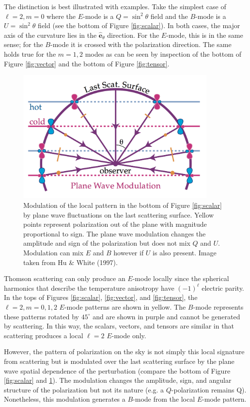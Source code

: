 \documentclass[a4paper,10pt]{article}
\begin{document}
{\noindent}The distinction is best illustrated with examples. Take the simplest case of $\ell=2,m=0$ where the $E$-mode is a $Q=\sin^2\theta$ field and the $B$-mode is a $U=\sin^2\theta$ field (see the bottom of Figure \ref{fig:scalar}). In both cases, the major axis of the curvature lies in the $\bm{\hat{e}}_\theta$ direction. For the $E$-mode, this is in the same sense; for the $B$-mode it is crossed with the polarization direction. The same holds true for the $m=1,2$ modes as can be seen by inspection of the bottom of Figure \ref{fig:vector} and the bottom of Figure \ref{fig:tensor}.

\begin{figure}[t!]
\centering
\includegraphics[width=10cm]{figures/CMBquad.png}
\caption{\footnotesize{Modulation of the local pattern in the bottom of Figure \ref{fig:scalar} by plane wave fluctuations on the last scattering surface. Yellow points represent polarization out of the plane with magnitude proportional to sign. The plane wave modulation changes the amplitude and sign of the polarization but does not mix $Q$ and $U$. Modulation can mix $E$ and $B$ however if $U$ is also present. Image taken from Hu \& White (1997).}}
\label{fig:cmbquad}
\end{figure}

{\noindent}Thomson scattering can only produce an $E$-mode locally since the spherical harmonics that describe the temperature anisotropy have $(-1)^\ell$ electric parity. In the tops of Figures \ref{fig:scalar}, \ref{fig:vector}, and \ref{fig:tensor}, the $\ell=2,m=0,1,2$ $E$-mode patterns are shown in yellow. The $B$-mode represents these patterns rotated by $45^\circ$ and are shown in purple and cannot be generated by scattering. In this way, the scalars, vectors, and tensors are similar in that scattering produces a local $\ell=2$ $E$-mode only.

{\noindent}However, the pattern of polarization on the sky is not simply this local signature from scattering but is modulated over the last scattering surface by the plane wave spatial dependence of the perturbation (compare the bottom of Figure \ref{fig:scalar} and \ref{fig:cmbquad}). The modulation changes the amplitude, sign, and angular structure of the polarization but not its nature (e.g. a $Q$-polarization remains Q). Nonetheless, this modulation generates a $B$-mode from the local $E$-mode pattern.
\end{document}
